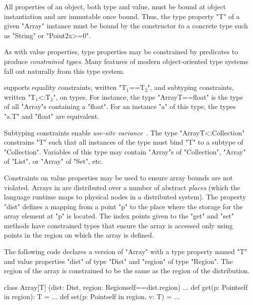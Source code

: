 All properties of an object, both type and value, must be bound at object
instantiation and are immutable once bound.  Thus, the type
property \xcd"T" of a given \xcd"Array" instance must be bound
by the constructor
to a concrete type such as \xcd"String" or \xcd"Point2{x>=0}".

As with value properties, type properties may be constrained
by predicates to produce \emph{constrained types}.
Many features of modern object-oriented type systems fall out
naturally from this type system.

\Xten{} supports
equality constraints, written \xcdmath"T$_1$==T$_2$", and
subtyping constraints, written \xcdmath"T$_1$<:T$_2$", on types.
For instance,
the type \xcd"Array{T==float}" is the type of all \xcd"Array"s
containing a \xcd"float".  For an instance \xcd"a" of this type,
the types \xcd"a.T" and \xcd"float" are equivalent.

Subtyping constraints enable
\emph{use-site variance}~\cite{variant-parametric-types}.
The type \xcd"Array{T<:Collection}"
constrains \xcd"T" such that all instances of the type must bind
\xcd"T" to a subtype of \xcd"Collection".  Variables of this
type may contain \xcd"Array"s of \xcd"Collection", \xcd"Array"
of \xcd"List", or \xcd"Array" of \xcd"Set", etc.

Constraints on value properties may be used to ensure array
bounds are not violated.
Arrays in \Xten{} are distributed 
over a number of abstract {\em places} (which the language runtime
maps to physical nodes in a distributed system).  The property
\xcd"dist" defines a mapping from a point \xcd"p" to the place
where the storage for the array element at \xcd"p" is located. 
The index points given to the \xcd"get" and \xcd"set" methods
have constrained types that ensure the array is accessed only
using points in the region on which the array is defined.

The following code declares a version of \xcd"Array" with a type
property named \xcd"T" and value properties \xcd"dist" of type
\xcd"Dist" and \xcd"region" of type \xcd"Region".
The region
of the array is constrained to be the same as 
the region of the distribution.
\begin{xten}
class Array[T]
  (dist: Dist,
   region: Region{self==dist.region})
{ ...
  def get(p: Point{self in region}): T = ...
  def set(p: Point{self in region}, v: T) = ...
}
\end{xten}

